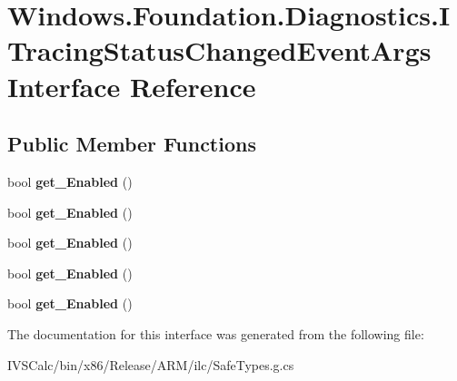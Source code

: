 \hypertarget{interface_windows_1_1_foundation_1_1_diagnostics_1_1_i_tracing_status_changed_event_args}{}\section{Windows.\+Foundation.\+Diagnostics.\+I\+Tracing\+Status\+Changed\+Event\+Args Interface Reference}
\label{interface_windows_1_1_foundation_1_1_diagnostics_1_1_i_tracing_status_changed_event_args}
\subsection*{Public Member Functions}
\begin{DoxyCompactItemize}
\item 
\mbox{\label{interface_windows_1_1_foundation_1_1_diagnostics_1_1_i_tracing_status_changed_event_args_a4e1421a361f46d9c9401aa9bb6e4b0c0}} 
bool {\bfseries get\+\_\+\+Enabled} ()
\item 
\mbox{\label{interface_windows_1_1_foundation_1_1_diagnostics_1_1_i_tracing_status_changed_event_args_a4e1421a361f46d9c9401aa9bb6e4b0c0}} 
bool {\bfseries get\+\_\+\+Enabled} ()
\item 
\mbox{\label{interface_windows_1_1_foundation_1_1_diagnostics_1_1_i_tracing_status_changed_event_args_a4e1421a361f46d9c9401aa9bb6e4b0c0}} 
bool {\bfseries get\+\_\+\+Enabled} ()
\item 
\mbox{\label{interface_windows_1_1_foundation_1_1_diagnostics_1_1_i_tracing_status_changed_event_args_a4e1421a361f46d9c9401aa9bb6e4b0c0}} 
bool {\bfseries get\+\_\+\+Enabled} ()
\item 
\mbox{\label{interface_windows_1_1_foundation_1_1_diagnostics_1_1_i_tracing_status_changed_event_args_a4e1421a361f46d9c9401aa9bb6e4b0c0}} 
bool {\bfseries get\+\_\+\+Enabled} ()
\end{DoxyCompactItemize}


The documentation for this interface was generated from the following file\+:\begin{DoxyCompactItemize}
\item 
I\+V\+S\+Calc/bin/x86/\+Release/\+A\+R\+M/ilc/Safe\+Types.\+g.\+cs\end{DoxyCompactItemize}
